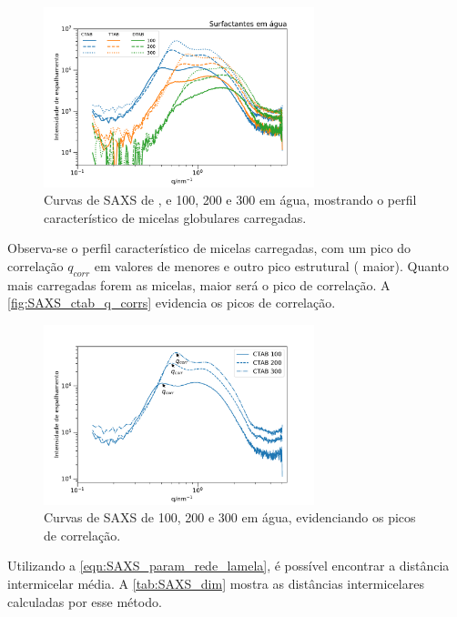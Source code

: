 	\begin{figure}[h]
		\centering
		\includegraphics[width=0.7\textwidth]{imagens/saxs/micelas_esfericas}
		\caption{Curvas de SAXS de \CTAB, \TTAB{} e \DTAB{} 100, 200 e 300 \mM{} em água, mostrando o perfil característico de micelas globulares carregadas.}
		\label{fig:SAXS_micelas_esfericas}
	\end{figure}
	
	Observa-se o perfil característico de micelas carregadas, com um pico do correlação \(q_{corr}\) em valores de \q{} menores e outro pico estrutural (\q{} maior).\cite{Lutz-Bueno2017} Quanto mais carregadas forem as micelas, maior será o pico de correlação. A \autoref{fig:SAXS_ctab_q_corrs} evidencia os picos de correlação. 
	
	\begin{figure}[h]
		\centering
		\includegraphics[width=0.7\textwidth]{imagens/saxs/CTAB_q_corrs}
		\caption{Curvas de SAXS de \CTAB{} 100, 200 e 300 \mM{} em água, evidenciando os picos de correlação.}
		\label{fig:SAXS_ctab_q_corrs}
	\end{figure}

	Utilizando a \autoref{eqn:SAXS_param_rede_lamela}, é possível encontrar a distância intermicelar média. A \autoref{tab:SAXS_dim} mostra as distâncias intermicelares calculadas por esse método.
	
